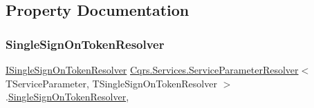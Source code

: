 \subsection{Property Documentation}
\mbox{\label{classCqrs_1_1Services_1_1ServiceParameterResolver_a08650fb09869509a27501652649738f4_a08650fb09869509a27501652649738f4}} 
\subsubsection{\texorpdfstring{Single\+Sign\+On\+Token\+Resolver}{SingleSignOnTokenResolver}}
{\footnotesize\ttfamily \hyperlink{interfaceCqrs_1_1Services_1_1ISingleSignOnTokenResolver}{I\+Single\+Sign\+On\+Token\+Resolver} \hyperlink{classCqrs_1_1Services_1_1ServiceParameterResolver}{Cqrs.\+Services.\+Service\+Parameter\+Resolver}$<$ T\+Service\+Parameter, T\+Single\+Sign\+On\+Token\+Resolver $>$.\hyperlink{classCqrs_1_1Authentication_1_1SingleSignOnTokenResolver}{Single\+Sign\+On\+Token\+Resolver}\hspace{0.3cm}{\ttfamily [get]}, {\ttfamily [protected]}}

